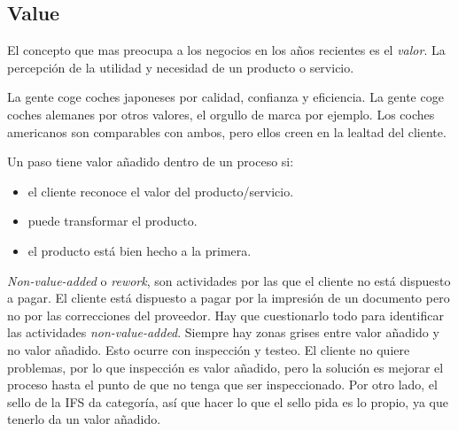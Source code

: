 \documentclass[]{article}
\begin{document}
\subsection{Value}

El concepto que mas preocupa a los negocios en los años recientes es el \textit{valor}. La percepción de la utilidad y necesidad de un producto o servicio. 

La gente coge coches japoneses por calidad, confianza y eficiencia. La gente coge coches alemanes por otros valores, el orgullo de marca por ejemplo. Los coches americanos son comparables con ambos, pero ellos creen en la lealtad del cliente. 

Un paso tiene valor añadido dentro de un proceso si: \begin{itemize} \item el cliente reconoce el valor del producto/servicio. \item puede transformar el producto. \item el producto está bien hecho a la primera. \end{itemize}

\textit{Non-value-added} o \textit{rework}, son actividades por las que el cliente no está dispuesto a pagar. El cliente está dispuesto a pagar por la impresión de un documento pero no por las correcciones del proveedor. Hay que cuestionarlo todo para identificar las actividades \textit{non-value-added}. Siempre hay zonas grises entre valor añadido y no valor añadido. Esto ocurre con inspección y testeo. El cliente no quiere problemas, por lo que inspección es valor añadido, pero la solución es mejorar el proceso hasta el punto de que no tenga que ser inspeccionado. Por otro lado, el sello de la IFS da categoría, así que hacer lo que el sello pida es lo propio, ya que tenerlo da un valor añadido.
\end{document}

